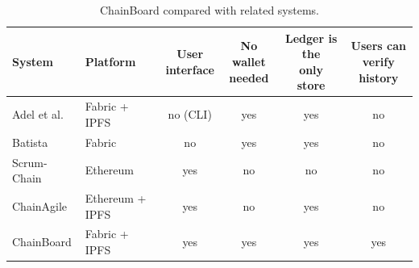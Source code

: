 \begin{table}[!htb]
    \centering
    \small
    \setlength{\tabcolsep}{4pt}
    \begin{tabular}{llcccc}
        \toprule
        System & Platform & \shortstack{User\\interface} & \shortstack{No wallet\\needed} & \shortstack{Ledger is the\\only store} & \shortstack{Users can\\verify history} \\
        \midrule
        Adel et al.~\cite{adel2023} & Fabric + IPFS & no (CLI) & yes & yes & no \\
        Batista~\cite{batista2021} & Fabric & no & yes & yes & no \\
        Scrum-Chain & Ethereum & yes & no & no & no \\
        ChainAgile & Ethereum + IPFS & yes & no & yes & no \\
        ChainBoard & Fabric + IPFS & yes & yes & yes & yes \\
        \bottomrule
    \end{tabular}
    \caption{ChainBoard compared with related systems.}
    \label{tab:related}
\end{table}
